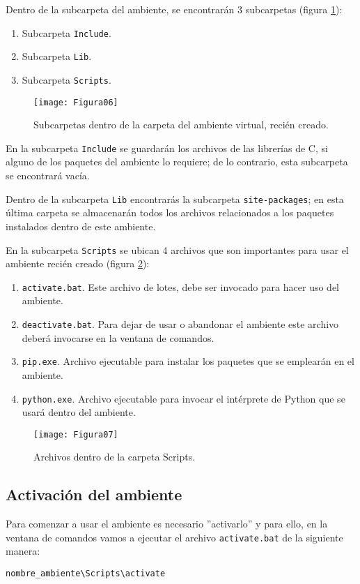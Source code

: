 Dentro de la subcarpeta del ambiente, se encontrarán 3 subcarpetas (figura \ref{fig:figura06}):
\begin{enumerate}
    \item Subcarpeta \texttt{Include}.
    \item Subcarpeta \texttt{Lib}. 
    \item Subcarpeta \texttt{Scripts}.
\end{enumerate}
	
\begin{figure}[H]
\centering
\texttt{[image: Figura06]}
\caption{Subcarpetas dentro de la carpeta del ambiente virtual, recién creado.}
\label{fig:figura06}
\end{figure}
	
En la subcarpeta \texttt{Include} se guardarán los archivos de las librerías de C, si alguno de los paquetes del ambiente lo requiere; de lo contrario, esta subcarpeta se encontrará vacía.\bigskip
	
Dentro de la subcarpeta \texttt{Lib} encontrarás la subcarpeta \texttt{site-packages}; en esta última carpeta se almacenarán todos los archivos relacionados a los paquetes instalados dentro de este ambiente.\bigskip
	
En la subcarpeta \texttt{Scripts} se ubican 4 archivos que son importantes para usar el ambiente recién creado (figura \ref{fig:figura07}):
\begin{enumerate}\label{listref}
    \item \texttt{activate.bat}. Este archivo de lotes, debe ser invocado para hacer uso del ambiente.
    \item \texttt{deactivate.bat}. Para dejar de usar o abandonar el ambiente este archivo deberá invocarse en la ventana de comandos.
    \item \texttt{pip.exe}. Archivo ejecutable para instalar los paquetes que se emplearán en el ambiente.
    \item \texttt{python.exe}. Archivo ejecutable para invocar el intérprete de Python que se usará dentro del ambiente.
\end{enumerate}
	
\begin{figure}[H]
\centering
\texttt{[image: Figura07]}
\caption{Archivos dentro de la carpeta Scripts.}
\label{fig:figura07}
\end{figure}
	
\subsection{Activación del ambiente}
Para comenzar a usar el ambiente es necesario ''activarlo'' y para ello, en la ventana de comandos vamos a ejecutar el archivo \texttt{activate.bat} de la siguiente manera:
\begin{verbatim}
nombre_ambiente\Scripts\activate
\end{verbatim}
	

